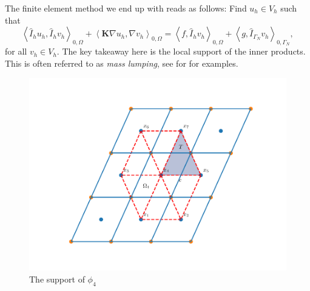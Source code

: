 \documentclass[../Main/main.tex]{subfiles}
\begin{document}
	The finite element method we end up with reads as follows: Find $u_h\in V_h$ such that
	\begin{equation} \label{eq:modified_fem}
			\left \langle \hat{I}_h u_h,\hat{I}_h v_h \right \rangle_{0,\Omega} +   \left \langle\bm{K} \nabla u_h,\nabla v_h \right \rangle_{0,\Omega} = \left \langle f,\hat{I}_h v_h \right \rangle_{0,\Omega} + \left \langle g,\hat{I}_{\Gamma_N} v_h \right \rangle_{0,\Gamma_N},
	\end{equation}
	for all $v_h\in V_h$. 
	The key takeaway here is the local support of the inner products. This is often referred to as \emph{mass lumping}, see for \cite{baranger1996connection} for examples.  
	\par
		\begin{figure}[H]
		\centering
		\includegraphics[width=1\textwidth]{Control volume.pdf}
		\caption{The support of $\phi_4$}
		\label{fig:control volume}
	\end{figure}
\end{document}
